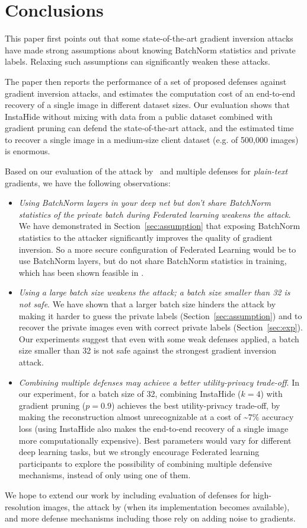 \section{Conclusions}
\label{sec:discussion}

This paper first points out that some state-of-the-art gradient inversion attacks have made strong assumptions about knowing BatchNorm statistics and private labels.  Relaxing such assumptions can significantly weaken these attacks.

The paper then reports the performance of a set of proposed defenses against gradient inversion attacks, and estimates the computation cost of an end-to-end recovery of a single image in different dataset sizes. Our evaluation shows that InstaHide without mixing with data from a public dataset combined with gradient pruning can defend the state-of-the-art attack, and the estimated time to recover a single image in a medium-size client dataset (e.g. of 500,000 images) is enormous.


Based on our evaluation of the attack by~\citep{geiping2020inverting} and multiple defenses for {\em plain-text} gradients, we have the following observations:

\begin{itemize}
    \item {\em Using BatchNorm layers in your deep net but don't share BatchNorm statistics of the private batch during Federated learning weakens the attack}. We have demonstrated in Section~\ref{sec:assumption} that exposing BatchNorm statistics to the attacker significantly improves the quality of gradient inversion. So a more secure configuration of Federated Learning would be to use BatchNorm layers, but do not share BatchNorm statistics in training, which has been shown feasible in \citep{andreux2020siloed, li2021fedbn}.
    
    \item {\em Using a large batch size weakens the attack; a batch size smaller than 32 is not safe}. We have shown that a larger batch size hinders the attack by making it harder to guess the private labels (Section~\ref{sec:assumption}) and to recover the private images even with correct private labels (Section~\ref{sec:exp}). Our experiments suggest that even with some weak defenses applied, a batch size smaller than 32 is not safe against the strongest gradient inversion attack. 
    
    \item {\em Combining multiple defenses may achieve a better utility-privacy trade-off}. In our experiment, for a batch size of 32, combining InstaHide ($k=4$) with gradient pruning ($p=0.9$) achieves the best utility-privacy trade-off, by making the reconstruction almost unrecognizable at a cost of \textasciitilde$7\%$ accuracy loss (using InstaHide also makes the end-to-end recovery of a single image more computationally expensive). Best parameters would vary for different deep learning tasks, but we strongly encourage Federated learning participants to explore the possibility of combining multiple defensive mechanisms, instead of only using one of them. 
    
\end{itemize}


We hope to extend our work by including  evaluation of defenses for high-resolution images, the attack by \citep{yin2021see}  (when its implementation becomes available), and more defense mechanisms  including those rely on adding noise to gradients. 
 
